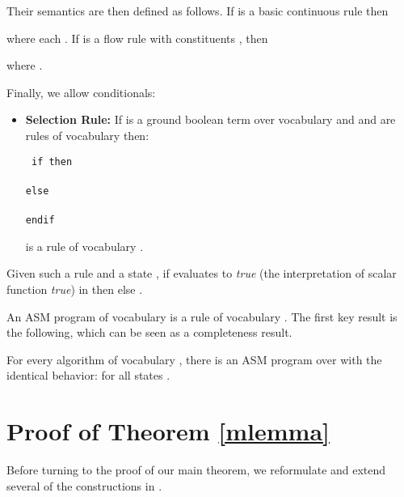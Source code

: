 \documentclass[envcountsame]{llncs}
\newcommand{\nd}[1]{#1}\let\ep\endproof
\renewcommand{\endproof}{\qed\ep}
\newenvironment{ttcode}{\begin{ttfamily}\rm\tt}{\end{ttfamily}}
\newcommand\s{\phantom{x}}
\begin{document}
Their semantics are then defined as follows.
If  is a  basic continuous rule  then

where each .
If  is a  flow rule with constituents , then

where .


Finally, we allow conditionals:

\begin{definition}
\begin{itemize}
\item \textbf{Selection Rule:}
If  is a ground boolean term over vocabulary  and
   and  are  rules of vocabulary  then:
   \begin{center}
   \begin{minipage}{8cm}
    \begin{ttcode}
      if  then \\
     \s  \\ 
      else\\
      \s  \\ 
      endif \\
    \end{ttcode}
   \end{minipage}
   \end{center}
is a rule of vocabulary .
\end{itemize}
\end{definition}



Given such a rule  and a state , if  evaluates to
 \textit{true} (the interpretation of scalar function \textit{true}) in   then
 else .


An ASM program of vocabulary  is a rule of vocabulary .
The first key result is the following, which can be seen as a
completeness result.


\begin{theorem}[Completeness] \label{mlemma} \nd{For every algorithm of vocabulary , there
  is an ASM program  over   with the identical behavior:
   for all states .}
 \end{theorem}



\section{Proof of Theorem \ref{mlemma}}


Before turning to the proof of our main theorem, we reformulate and
extend several of the constructions in \cite{Gur00}.
\end{document}

